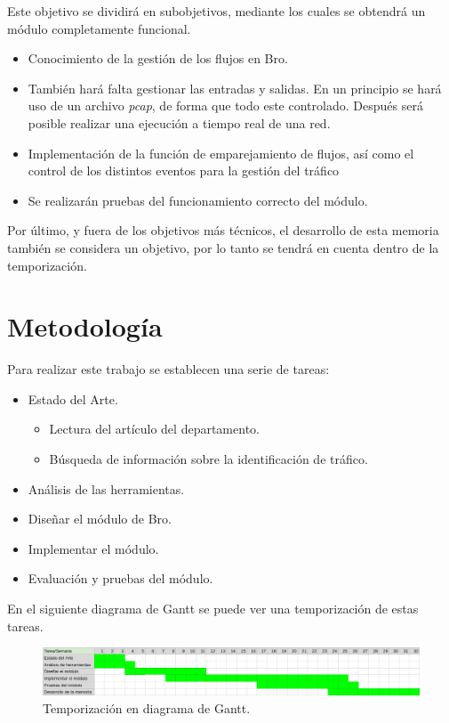 \intro Este objetivo se dividirá en subobjetivos, mediante los cuales se obtendrá un módulo completamente funcional.

\begin{itemize}
\item Conocimiento de la gestión de los flujos en Bro.
\item También hará falta gestionar las entradas y salidas. En un principio se hará uso de un archivo \textit{pcap}, de forma 
que todo este controlado. Después será posible realizar una ejecución a tiempo real de una red.
\item Implementación de la función de emparejamiento de flujos, así como el control de los distintos eventos para la gestión del 
tráfico
\item Se realizarán pruebas del funcionamiento correcto del módulo.
\end{itemize}

\intro Por último, y fuera de los objetivos más técnicos, el desarrollo de esta memoria también se considera un objetivo, por 
lo tanto se tendrá en cuenta dentro de la temporización.

\section{Metodología}

Para realizar este trabajo se establecen una serie de tareas:

\begin{itemize}
\item Estado del Arte.
	\begin{itemize}
	\item Lectura del artículo del departamento. \cite{comparacion}
	\item Búsqueda de información sobre la identificación de tráfico.
	\end{itemize}
\item Análisis de las herramientas.
\item Diseñar el módulo de Bro.
\item Implementar el módulo.
\item Evaluación y pruebas del módulo.
\end{itemize}

\intro En el siguiente diagrama de Gantt se puede ver una temporización de estas tareas. 

\begin{figure}[H]
  \includegraphics[width=1\textwidth]{imagenes/temporizacion.png} 
  \centering
  \caption{Temporización en diagrama de Gantt.}
\end{figure}

